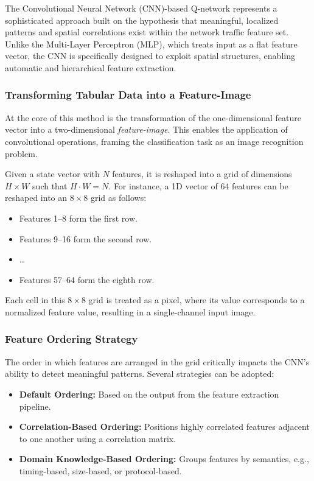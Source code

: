 \documentclass[16pt]{report}
\begin{document}
The Convolutional Neural Network (CNN)-based Q-network represents a sophisticated approach built on the hypothesis that meaningful, localized patterns and spatial correlations exist within the network traffic feature set. Unlike the Multi-Layer Perceptron (MLP), which treats input as a flat feature vector, the CNN is specifically designed to exploit spatial structures, enabling automatic and hierarchical feature extraction.

\subsubsection*{Transforming Tabular Data into a Feature-Image}

At the core of this method is the transformation of the one-dimensional feature vector into a two-dimensional \textit{feature-image}. This enables the application of convolutional operations, framing the classification task as an image recognition problem.

Given a state vector with $N$ features, it is reshaped into a grid of dimensions $H \times W$ such that $H \cdot W = N$. For instance, a 1D vector of 64 features can be reshaped into an $8 \times 8$ grid as follows:

\begin{itemize}
    \item Features 1--8 form the first row.
    \item Features 9--16 form the second row.
    \item \dots
    \item Features 57--64 form the eighth row.
\end{itemize}

Each cell in this $8 \times 8$ grid is treated as a pixel, where its value corresponds to a normalized feature value, resulting in a single-channel input image.

\subsubsection*{Feature Ordering Strategy}

The order in which features are arranged in the grid critically impacts the CNN’s ability to detect meaningful patterns. Several strategies can be adopted:

\begin{itemize}
    \item \textbf{Default Ordering:} Based on the output from the feature extraction pipeline.
    \item \textbf{Correlation-Based Ordering:} Positions highly correlated features adjacent to one another using a correlation matrix.
    \item \textbf{Domain Knowledge-Based Ordering:} Groups features by semantics, e.g., timing-based, size-based, or protocol-based.
\end{itemize}
\end{document}
